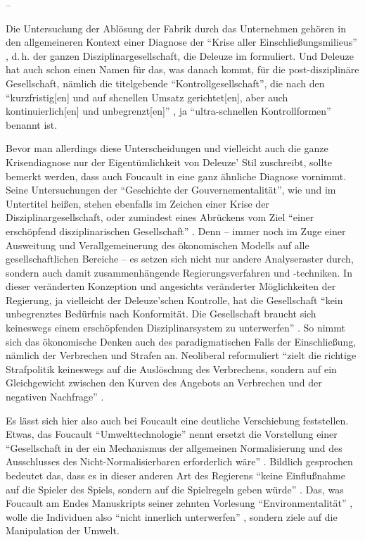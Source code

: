 \documentclass[12pt,
               DIV13,
               paper=a4,
               twoside=false,
               onehalfspacing,
               bibliography=totoc,
               toc=graduated,
               draft,
               ]{scrartcl}
\newcommand{\pc}[2]{\parencite[#1]{#2}}
\begin{document}
--

Die Untersuchung der Ablösung der Fabrik durch das Unternehmen gehören
in den allgemeineren Kontext einer Diagnose der "`Krise aller
Einschließungsmilieus"' \pc{255}{ps}, d.\,h. der ganzen
Disziplinargesellschaft, die Deleuze im  formuliert. Und
Deleuze hat auch schon einen Namen für das, was danach kommt, für die
post-disziplinäre Gesellschaft, nämlich die titelgebende
"`Kontrollgesellschaft"', die nach den "`kurzfristig[en] und auf
shcnellen Umsatz gerichtet[en], aber auch kontinuierlich[en] und
unbegrenzt[en]"' \pc{260}{ps}, ja "`ultra-schnellen Kontrollformen"'
\pc{255}{ps} benannt ist.

Bevor man allerdings diese Unterscheidungen und vielleicht auch die
ganze Krisendiagnose nur der Eigentümlichkeit von Deleuze' Stil
zuschreibt, sollte bemerkt werden, dass auch Foucault in \cite{gbp}
eine ganz ähnliche Diagnose vornimmt. Seine Untersuchungen der
"`Geschichte der Gouvernementalität"', wie \cite{stb} und \cite{gbp}
im Untertitel heißen, stehen ebenfalls im Zeichen einer Krise der
Disziplinargesellschaft, oder zumindest eines Abrückens vom Ziel
"`einer erschöpfend disziplinarischen Gesellschaft"' \pc{359}{gbp}.
Denn -- immer noch im Zuge einer Ausweitung und Verallgemeinerung des
ökonomischen Modells auf alle gesellschaftlichen Bereiche -- es setzen
sich nicht nur andere Analyseraster durch, sondern auch damit
zusammenhängende Regierungsverfahren und -techniken. In dieser
veränderten Konzeption und angesichts veränderter Möglichkeiten der
Regierung, ja vielleicht der Deleuze'schen Kontrolle, hat die
Gesellschaft "`kein unbegrenztes Bedürfnis nach Konformität. Die
Gesellschaft braucht sich keineswegs einem erschöpfenden
Disziplinarsystem zu unterwerfen"' \pc{354}{gbp}. So nimmt sich das
ökonomische Denken auch des paradigmatischen Falls der Einschließung,
nämlich der Verbrechen und Strafen an. Neoliberal reformuliert "`zielt
die richtige Strafpolitik keineswegs auf die Auslöschung des
Verbrechens, sondern auf ein Gleichgewicht zwischen den Kurven des
Angebots an Verbrechen und der negativen Nachfrage"' \pc{354}{gbp}.

Es lässt sich hier also auch bei Foucault eine deutliche Verschiebung
feststellen. Etwas, das Foucault "`Umwelttechnologie"' nennt
\pc{359}{gbp} ersetzt die Vorstellung einer "`Gesellschaft in der ein
Mechanismus der allgemeinen Normalisierung und des Ausschlusses des
Nicht-Normalisierbaren erforderlich wäre"' \pc{359}{gbp}. Bildlich
gesprochen bedeutet das, dass es in dieser anderen Art des Regierens
"`keine Einflußnahme auf die Spieler des Spiels, sondern auf die
Spielregeln geben würde"' \pc{359}{gbp}. Das, was Foucault am Endes
Manuskripts seiner zehnten Vorlesung "`Environmentalität"' \pc{Fn., S.
361}{gbp}, wolle die Individuen also "`nicht innerlich unterwerfen"'
\pc{359}{gbp}, sondern ziele auf die Manipulation der Umwelt.
\end{document}
